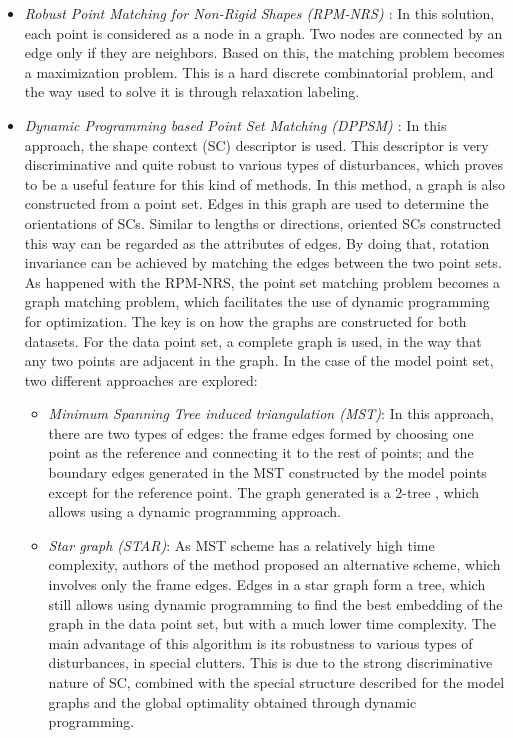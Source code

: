 \begin{itemize}
 \item \textit{Robust Point Matching for Non-Rigid Shapes (RPM-NRS) \cite{zheng2006robust}}: In this solution, each 
point is considered as a node in a graph. Two nodes are connected by an edge only if they are neighbors. Based on this, 
the matching problem becomes a maximization problem. This is a hard discrete combinatorial problem, and the way used to 
solve it is through relaxation labeling.
 \item \textit{Dynamic Programming based Point Set Matching (DPPSM) \cite{lian2012rotation}}: In this approach, the 
shape context (SC) descriptor is used. This descriptor is very discriminative and quite robust to various types of 
disturbances, which proves to be a useful feature for this kind of methods. In this method, a graph is also 
constructed from a point set. Edges in this graph are used to determine the orientations of SCs. Similar to lengths or 
directions, oriented SCs constructed this way can be regarded as the attributes of edges. By doing that, rotation 
invariance can be achieved by matching the edges between the two point sets. As happened with the RPM-NRS, the point set 
matching problem becomes a graph matching problem, which facilitates the use of dynamic programming for optimization.
 The key is on how the graphs are constructed for both datasets. For the data point set, a complete graph is used, in 
the way that any two points are adjacent in the graph. In the case of the model point set, two different approaches are 
explored:
 \begin{itemize}
  \item \textit{Minimum Spanning Tree induced triangulation (MST)}: In this approach, there are two types of edges: the frame edges formed by choosing one point as the reference and connecting it to the rest of points; and the boundary edges generated in the MST constructed by the model points except for the reference point.
  The graph generated is a 2-tree \cite{west2001introduction}, which allows using a dynamic programming approach.
  \item \textit{Star graph (STAR)}: As MST scheme has a relatively high time complexity, authors of the method proposed an alternative scheme, which involves only the frame edges. Edges in a star graph form a tree, which still allows using dynamic programming to find the best embedding of the graph in the data point set, but with a much lower time complexity.
 The main advantage of this algorithm is its robustness to various types of disturbances, in special clutters. This is due to the strong discriminative nature of SC, combined with the special structure described for the model graphs and the global optimality obtained through dynamic programming.
 \end{itemize}
\end{itemize}

